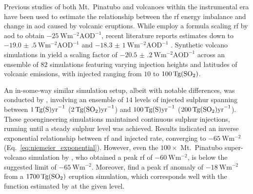\documentclass{ametsocV6.1}
\newcommand{\iso}[1][i]{{#1}njected \ce{SO2}}
\begin{document}
Previous studies of both Mt.\ Pinatubo \citep{mills2017,hansen2005} and volcanoes within
the instrumental era \citep{gregory2016} have been used to estimate the relationship
between the \gls{rf} energy imbalance and change in \gls{aod} caused by volcanic
eruptions. While \citet{myhre2013} employ a formula scaling \gls{rf} by \gls{aod} to
obtain \(\SI{-25}{\watt\metre^{-2}\mathrm{AOD}^{-1}}\), recent literature reports
estimates down to \(\SI{-19.0(5)}{\watt\metre^{-2}\mathrm{AOD}^{-1}}\)
\citep{gregory2016} and \(\SI{-18.3(10)}{\watt\metre^{-2}\mathrm{AOD}^{-1}}\)
\citep{mills2017}. Synthetic volcano simulations in \citet{marshall2020} yield a scaling
factor of \(\SI{-20.5(2)}{\watt\metre^{-2}\mathrm{AOD}^{-1}}\) across an ensemble of
\(82\) simulations featuring varying injection heights and latitudes of volcanic
emissions, with \iso{} ranging from \(10\) to \(\SI{100}{\tera\gram(\ce{SO2})}\).

An in-some-way similar simulation setup, albeit with notable differences, was conducted
by \citet{niemeier2015}, involving an ensemble of \(14\) levels of injected sulphur
spanning between \(\SI{1}{\tera\gram(\ce{S})\mathrm{yr}^{-1}}\)
(\(\SI{2}{\tera\gram(\ce{SO2})\mathrm{yr}^{-1}}\)) and
\(\SI{100}{\tera\gram(\ce{S})\mathrm{yr}^{-1}}\)
(\(\SI{200}{\tera\gram(\ce{SO2})\mathrm{yr}^{-1}}\)). These geoengineering simulations
maintained continuous sulphur injections, running until a steady sulphur level was
achieved. Results indicated an inverse exponential relationship between \gls{rf} and
\iso{} rate, converging to \(\SI{-65}{\watt\metre^{-2}}\)
(Eq.~\ref{eq:niemeier_exponential}). However, even the \(100\times\) Mt.\ Pinatubo
super-volcano simulation by \citet{jones2005}, who obtained a peak \gls{rf} of
\(\SI{-60}{\watt\metre^{-2}}\), is below the suggested limit of
\(\SI{-65}{\watt\metre^{-2}}\). Moreover, \citet{timmreck2010} find a peak \gls{rf}
anomaly of \(\SI{-18}{\watt\metre^{-2}}\) from a \(\SI{1700}{\tera\gram(\ce{SO2})}\)
eruption simulation, which corresponds well with the function estimated by
\citet{niemeier2015} at the given  level.
\end{document}
